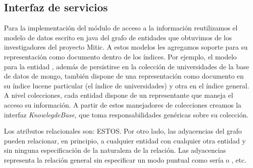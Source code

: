 






\subsection{Interfaz de servicios}
\label{subsec:modelos-db}

Para la implementación del módulo de acceso a la información reutilizamos el modelo de datos escrito en java del grafo de entidades que obtuvimos de los investigadores del proyecto Mitic. A estos modelos les agregamos soporte para su representación como documento dentro de los índices. Por ejemplo, el modelo para la entidad , además de persistirse en la colección de universidades de la base de datos de mongo, también dispone de una representación como documento en su índice lucene particular (el índice de universidades) y otra en el índice general. A nivel colecciones, cada entidad dispone de un representante que maneja el acceso su información. A partir de estos manejadores de colecciones creamos la interfaz \emph{KnowlegdeBase}, que toma responsabilidades genéricas sobre su colección.

Los atributos relacionales son: ESTOS.
Por otro lado, las adyacencias del grafo pueden relacionar, en principio, a cualquier entidad con cualquier otra entidad y sin ninguna especificación de la naturaleza de la relación. Las adyacencias representa la relación general  sin especificar un modo puntual como sería  o , etc. 


